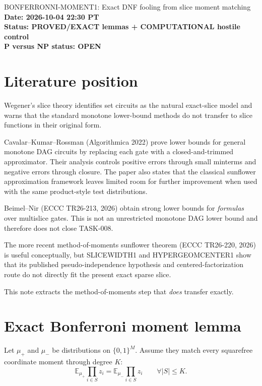 \documentclass[11pt]{article}
\begin{document}
\begin{center}
{\Large BONFERRONNI-MOMENT1: Exact DNF fooling from slice moment matching}\\[4pt]
\textbf{Date: 2026-10-04 22:30 PT}\\
\textbf{Status: PROVED/EXACT lemmas + COMPUTATIONAL hostile control}\\
\textbf{P versus NP status: OPEN}
\end{center}

\section{Literature position}

Wegener's slice theory identifies set circuits as the natural exact-slice
model and warns that the standard monotone lower-bound methods do not transfer
to slice functions in their original form.

Cavalar--Kumar--Rossman (Algorithmica 2022) prove lower bounds for general
monotone DAG circuits by replacing each gate with a closed-and-trimmed
approximator. Their analysis controls positive errors through small minterms
and negative errors through closure.  The paper also states that the
classical sunflower approximation framework leaves limited room for further
improvement when used with the same product-style test distributions.

Beimel--Nir (ECCC TR26-213, 2026) obtain strong lower bounds for
\emph{formulas} over multislice gates.  This is not an unrestricted monotone
DAG lower bound and therefore does not close TASK-008.

The more recent method-of-moments sunflower theorem (ECCC TR26-220, 2026) is
useful conceptually, but SLICEWIDTH1 and HYPERGEOMCENTER1 show that its
published pseudo-independence hypothesis and centered-factorization route do
not directly fit the present exact sparse slice.

This note extracts the method-of-moments step that \emph{does} transfer
exactly.

\section{Exact Bonferroni moment lemma}

Let \(\mu_+\) and \(\mu_-\) be distributions on
\(\{0,1\}^M\).  Assume they match every squarefree coordinate moment through
degree \(K\):
\[
\mathbb E_{\mu_+}\prod_{i\in S}z_i
=
\mathbb E_{\mu_-}\prod_{i\in S}z_i
\qquad
\forall |S|\le K.
\tag{1}
\]
\end{document}
